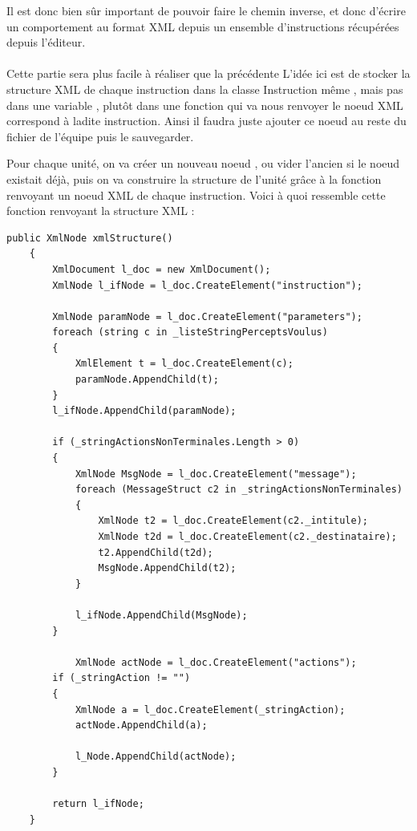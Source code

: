 \documentclass{report}
\begin{document}
Il est donc bien sûr important de pouvoir faire le chemin inverse, et donc d’écrire un comportement au format XML depuis un ensemble d’instructions récupérées depuis l’éditeur.

\paragraph{}

Cette partie sera plus facile à réaliser que la précédente 
L’idée ici est de stocker la structure XML de chaque instruction dans la classe Instruction même , mais pas dans une variable , plutôt dans une fonction qui va nous renvoyer le noeud XML correspond à ladite instruction. Ainsi il faudra juste ajouter ce noeud au reste du fichier de l’équipe puis le sauvegarder.

Pour chaque unité, on va créer un nouveau noeud , ou vider l’ancien si le noeud existait déjà, puis on va construire la structure de l’unité grâce à la fonction renvoyant un noeud XML de chaque instruction. 
Voici à quoi ressemble cette fonction renvoyant la structure XML :
\begin{lstlisting}[frame=single]
 public XmlNode xmlStructure()
    {
        XmlDocument l_doc = new XmlDocument();
        XmlNode l_ifNode = l_doc.CreateElement("instruction");

        XmlNode paramNode = l_doc.CreateElement("parameters");
        foreach (string c in _listeStringPerceptsVoulus)
        {
            XmlElement t = l_doc.CreateElement(c);
            paramNode.AppendChild(t);
        }
        l_ifNode.AppendChild(paramNode);

        if (_stringActionsNonTerminales.Length > 0)
        {
            XmlNode MsgNode = l_doc.CreateElement("message");
            foreach (MessageStruct c2 in _stringActionsNonTerminales)
            {
                XmlNode t2 = l_doc.CreateElement(c2._intitule);
                XmlNode t2d = l_doc.CreateElement(c2._destinataire);
                t2.AppendChild(t2d);
                MsgNode.AppendChild(t2);
            }

            l_ifNode.AppendChild(MsgNode);
        }

            XmlNode actNode = l_doc.CreateElement("actions");
        if (_stringAction != "")
        {
            XmlNode a = l_doc.CreateElement(_stringAction);
            actNode.AppendChild(a);

            l_Node.AppendChild(actNode);
        }

        return l_ifNode;
    }
\end{lstlisting}
\end{document}
